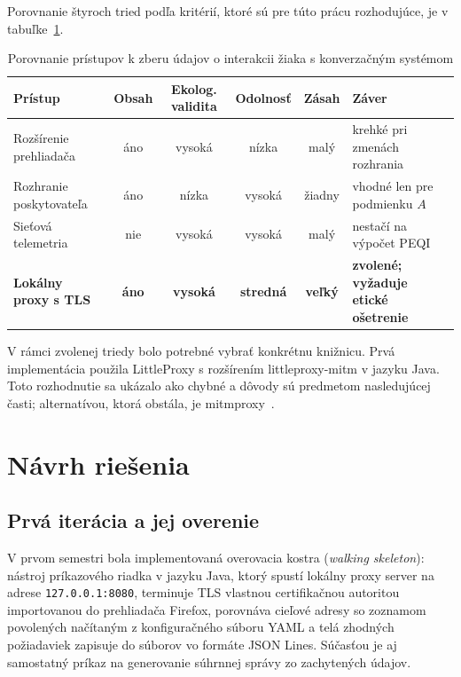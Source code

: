 Porovnanie štyroch tried podľa kritérií, ktoré sú pre túto prácu rozhodujúce, je v tabuľke~\ref{tab:zber-porovnanie}.

\begin{table}[H]
\centering
\caption{Porovnanie prístupov k zberu údajov o interakcii žiaka s konverzačným systémom}
\label{tab:zber-porovnanie}
\footnotesize
\begin{tabularx}{\textwidth}{@{}p{2.6cm} c c c c X@{}}
\toprule
\textbf{Prístup} & \textbf{Obsah} & \textbf{Ekolog. validita} & \textbf{Odolnosť} & \textbf{Zásah} & \textbf{Záver} \\
\midrule
Rozšírenie prehliadača & áno & vysoká & nízka & malý & krehké pri zmenách rozhrania \\
Rozhranie poskytovateľa & áno & nízka & vysoká & žiadny & vhodné len pre podmienku $A$ \\
Sieťová telemetria & nie & vysoká & vysoká & malý & nestačí na výpočet PEQI \\
\textbf{Lokálny proxy s TLS} & \textbf{áno} & \textbf{vysoká} & \textbf{stredná} & \textbf{veľký} & \textbf{zvolené; vyžaduje etické ošetrenie} \\
\bottomrule
\end{tabularx}
\end{table}

V rámci zvolenej triedy bolo potrebné vybrať konkrétnu knižnicu. Prvá implementácia použila LittleProxy s rozšírením littleproxy-mitm v jazyku Java. Toto rozhodnutie sa ukázalo ako chybné a dôvody sú predmetom nasledujúcej časti; alternatívou, ktorá obstála, je mitmproxy~\cite{mitmproxy}.

\section{Návrh riešenia}
\label{sec:riesenie}

\subsection{Prvá iterácia a jej overenie}

V prvom semestri bola implementovaná overovacia kostra (\emph{walking skeleton}): nástroj príkazového riadka v jazyku Java, ktorý spustí lokálny proxy server na adrese \texttt{127.0.0.1}\discretionary{}{}{}\texttt{:8080}, terminuje TLS vlastnou certifikačnou autoritou importovanou do prehliadača Firefox, porovnáva cieľové adresy so zoznamom povolených načítaným z konfiguračného súboru YAML a telá zhodných požiadaviek zapisuje do súborov vo formáte JSON Lines. Súčasťou je aj samostatný príkaz na generovanie súhrnnej správy zo zachytených údajov.

